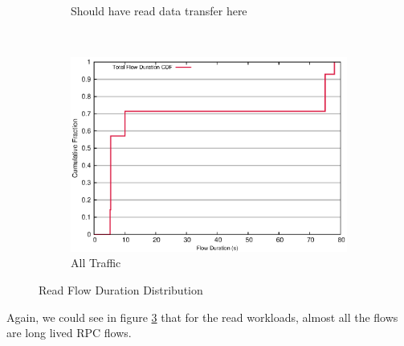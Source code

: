 \begin{figure}[!htpb]
\begin{subfigure}[b]{.45\linewidth}
	\caption{Should have read data transfer here}\label{fig:read_duration:nn_rpc}
   \end{subfigure} \\%
  \begin{subfigure}[b]{.55\linewidth}
   \centering
	\includegraphics[width=.99\textwidth]{figures/4read/flow_duration.eps}
	\caption{All Traffic}\label{fig:read_duration:all}
   \end{subfigure}%
\caption{Read Flow Duration Distribution}
\label{fig:read_duration}
\end{figure}

Again, we could see in figure \ref{fig:read_duration} that for the read workloads, almost all the flows are long lived RPC flows.

